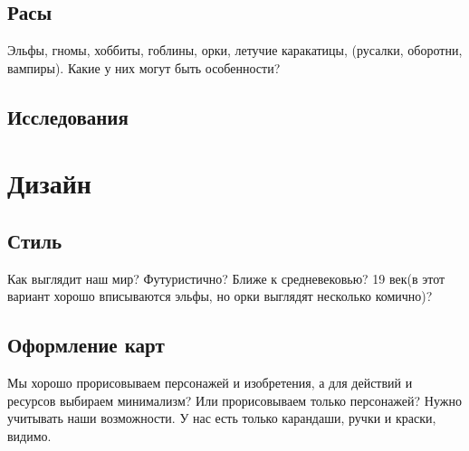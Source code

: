 \documentclass[a4paper,12pt]{article}
\begin{document}
    \subsection{Расы}

      Эльфы, гномы, хоббиты, гоблины, орки, летучие каракатицы, (русалки, оборотни, вампиры). Какие у них могут быть особенности?

    \subsection{Исследования}
  \section{Дизайн}
    \subsection{Стиль}
      Как выглядит наш мир? Футуристично? Ближе к средневековью? 19 век(в этот вариант хорошо вписываются эльфы, но орки выглядят несколько комично)?
    \subsection{Оформление карт}
      Мы хорошо прорисовываем персонажей и изобретения, а для действий и ресурсов выбираем минимализм? Или прорисовываем только персонажей? Нужно учитывать наши возможности. У нас есть только карандаши, ручки и краски, видимо.
      
\end{document}
